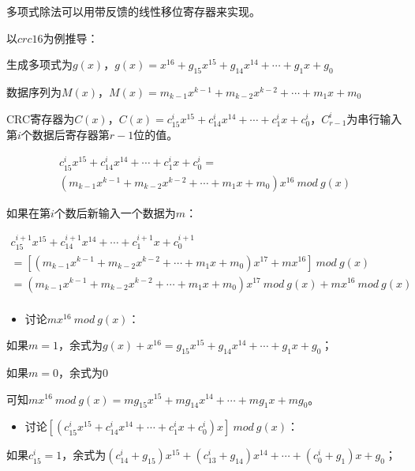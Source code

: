 \documentclass[
]{article}
\begin{document}
多项式除法可以用带反馈的线性移位寄存器来实现。

以$crc16$为例推导：

生成多项式为$g(x)$，$g(x)=x^{16}+g_{15}x^{15}+g_{14}x^{14}+\cdots+g_1x+g_0$

数据序列为$M(x)$，$M(x)=m_{k-1}x^{k-1}+m_{k-2}x^{k-2}+\cdots+m_1x+m_0$

CRC寄存器为$C(x)$，$C(x)=c_{15}^ix^{15}+c_{14}^ix^{14}+\cdots+c_1^ix+c_0^i$，$C_{r-1}^i$为串行输入第$i$个数据后寄存器第$r-1$位的值。

\begin{equation}
\begin{aligned}
c_{15}^ix^{15}+c_{14}^ix^{14}+\cdots+c_1^ix+c_0^i = \\ 
(m_{k-1}x^{k-1}+m_{k-2}x^{k-2}+\cdots+m_1x+m_0)x^{16} \: mod \: g(x)
\end{aligned}
\end{equation}

如果在第$i$个数后新输入一个数据为$m$：

\begin{equation}
\begin{aligned}
c_{15}^{i+1}x^{15}+c_{14}^{i+1}x^{14}+\cdots+c_1^{i+1}x+c_0^{i+1} \\ 
=[(m_{k-1}x^{k-1}+m_{k-2}x^{k-2}+\cdots+m_1x+m_0)x^{17}+mx^{16}] \: mod \: g(x)\\
=(m_{k-1}x^{k-1}+m_{k-2}x^{k-2}+\cdots+m_1x+m_0)x^{17} \: mod \: g(x)+mx^{16} \: mod \: g(x)\\
\end{aligned}
\end{equation}

\begin{itemize}
\item
  讨论$mx^{16} \: mod \: g(x)$：
\end{itemize}

如果$m=1$，余式为$g(x)+x^{16}=g_{15}x^{15}+g_{14}x^{14}+\cdots+g_1x+g_0$；

如果$m=0$，余式为$0$

可知$mx^{16} \: mod \: g(x) = mg_{15}x^{15}+mg_{14}x^{14}+\cdots+mg_1x+mg_0$。

\begin{itemize}
\item
  讨论$[(c_{15}^ix^{15}+c_{14}^ix^{14}+\cdots+c_1^ix+c_0^i)x] \: mod \: g(x)$：
\end{itemize}

如果$c_{15}^i=1$，余式为$(c_{14}^i+g_{15})x^{15}+(c_{13}^i+g_{14})x^{14}+\cdots+(c_0^i+g_1)x+g_0$；
\end{document}
